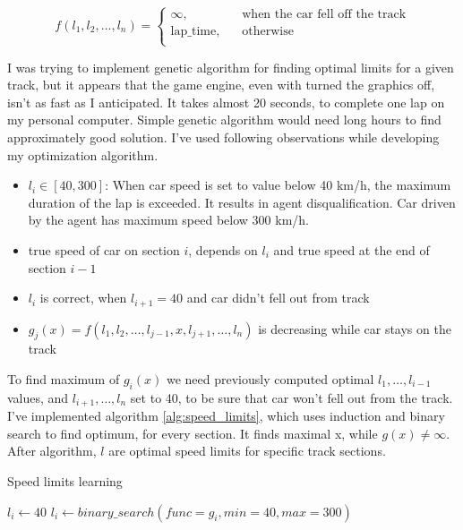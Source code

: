 \documentclass[declaration,shortabstract,english,inz]{iithesis}
\begin{document}
$$ f(l_1, l_2, \dots, l_n ) =  \begin{cases}
    \infty, &\quad \text{when the car fell off the track}\\
    \text{lap\_time}, &\quad \text{otherwise} \\
  \end{cases}
 $$

I was trying to implement genetic algorithm for finding optimal limits for a given track, but it appears that the game engine, even with turned the graphics off, isn't as fast as I anticipated.
It takes almost 20 seconds, to complete one lap on my personal computer.
Simple genetic algorithm would need long hours to find approximately good solution.
I've used following observations while developing my optimization algorithm.

\begin{itemize}
    \item  $l_i \in [40, 300]$: When car speed is set to value below 40 km/h, the maximum duration of the lap is exceeded. It results in agent disqualification. Car driven by the agent has maximum speed below 300 km/h.
    \item  true speed of car on section $i$, depends on $l_i$ and true speed at the end of section $i-1$
    \item
    $l_i$ is correct, when $l_{i+1} = 40$ and car didn't fell out from track
    \item  $g_j(x) = f(l_1,l_2, \dots,l_{j-1}, x, l_{j+1}, \dots, l_n)$ is decreasing while car stays on the track
    
\end{itemize}


To find maximum of $g_i(x)$ we need previously computed optimal $l_1, \dots, l_{i-1}$ values, and $l_{i+1}, \dots, l_n$ set to 40, to be sure that car won't fell out from the track. 
I've implemented algorithm \ref{alg:speed_limits}, which uses induction and binary search to find optimum, for every section. 
It finds maximal x, while $g(x) \neq \infty$.
After algorithm, $l$ are optimal speed limits for specific track sections.

\begin{algorithm}
    \caption{Speed limits learning}
    \label{alg:speed_limits}
    \begin{algorithmic}
            \STATE $l_i \gets 40$
        \ENDFOR
            \STATE $l_i \gets binary\_search(func=g_i, min=40, max=300)$
        \ENDFOR
    \end{algorithmic}
\end{algorithm}
\end{document}
